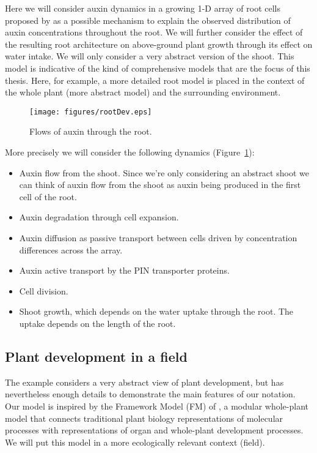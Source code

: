 \documentclass[phd]{infthesis}
\begin{document}
Here we will consider auxin dynamics in a growing 1-D array of root cells
proposed by \citep{mironova_plausible_2010} as a possible mechanism to explain
the observed distribution of auxin concentrations throughout the root. We will
further consider the effect of the resulting root architecture on above-ground
plant growth through its effect on water intake. We will only consider a very
abstract version of the shoot. This model is indicative of the kind of
comprehensive models that are the focus of this thesis. Here, for example, a
more detailed root model is placed in the context of the whole plant (more
abstract model) and the surrounding environment.

\begin{figure}
\centering
\texttt{[image: figures/rootDev.eps]}
\caption{Flows of auxin through the root.}
\label{fig:rootDev}
\end{figure}

More precisely we will consider the following dynamics
(Figure~\ref{fig:rootDev}):
\begin{itemize}
\item Auxin flow from the shoot. Since we're only considering an abstract shoot
we can think of auxin flow from the shoot as auxin being produced in the first
cell of the root.
\item Auxin degradation through cell expansion.
\item Auxin diffusion as passive transport between cells driven by concentration
differences across the array.
\item Auxin active transport by the PIN transporter proteins.
\item Cell division.
\item Shoot growth, which depends on the water uptake through the root. The
uptake depends on the length of the root.
\end{itemize}


\subsection{Plant development in a field}
\label{subsec:plantDev}
The example considers a very abstract view of plant development, but has
nevertheless enough details to demonstrate the main features of our
notation. Our model is inspired by the Framework Model (FM) of
\citet{chew_multiscale_2014}, a modular whole-plant model that connects
traditional plant biology representations of molecular processes with
representations of organ and whole-plant development processes. We will put this
model in a more ecologically relevant context (field).
\end{document}
